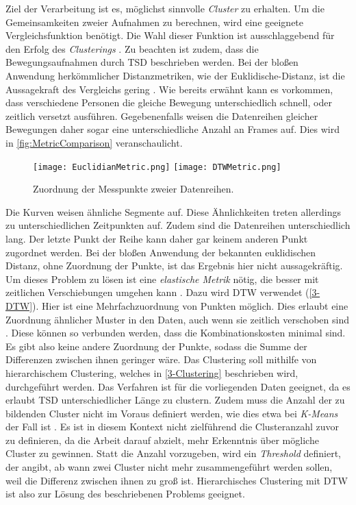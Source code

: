 Ziel der Verarbeitung ist es, möglichst sinnvolle \emph{Cluster} zu erhalten.
Um die Gemeinsamkeiten zweier Aufnahmen zu berechnen,
wird eine geeignete Vergleichsfunktion benötigt.
Die Wahl dieser Funktion ist ausschlaggebend für den Erfolg des \emph{Clusterings} \citep{warren_liao_clustering_2005}.
Zu beachten ist zudem, dass die Bewegungsaufnahmen durch \ac{TSD} beschrieben werden.
Bei der bloßen Anwendung herkömmlicher Distanzmetriken, wie der Euklidische-Distanz,
ist die Aussagekraft des Vergleichs gering \citep{warren_liao_clustering_2005}.
Wie bereits erwähnt kann es vorkommen, dass verschiedene Personen die gleiche Bewegung unterschiedlich schnell,
oder zeitlich versetzt ausführen.
Gegebenenfalls weisen die Datenreihen gleicher Bewegungen daher sogar eine unterschiedliche Anzahl an Frames auf.
Dies wird in \autoref{fig:MetricComparison} veranschaulicht.
\begin{figure}[ht]
    \begin{center}
    \texttt{[image: EuclidianMetric.png]}
    \texttt{[image: DTWMetric.png]}
    \end{center}
    \caption{Zuordnung der Messpunkte zweier Datenreihen.}
    \label{fig:MetricComparison}
\end{figure}
Die Kurven weisen ähnliche Segmente auf.
Diese Ähnlichkeiten treten allerdings zu unterschiedlichen Zeitpunkten auf.
Zudem sind die Datenreihen unterschiedlich lang.
Der letzte Punkt der Reihe kann daher gar keinem anderen Punkt zugordnet werden.
Bei der bloßen Anwendung der bekannten euklidischen Distanz,
ohne Zuordnung der Punkte, ist das Ergebnis hier nicht aussagekräftig.
Um dieses Problem zu lösen ist eine \emph{elastische Metrik} nötig,
die besser mit zeitlichen Verschiebungen umgehen kann \citep{aghabozorgi_time-series_2015}.
Dazu wird \ac{DTW} verwendet (\autoref{3-DTW}).
Hier ist eine Mehrfachzuordnung von Punkten möglich.
Dies erlaubt eine Zuordnung ähnlicher Muster in den Daten, auch wenn sie zeitlich verschoben sind \citep{mohammadzade_dynamic_2021}.
Diese können so verbunden werden, dass die Kombinationskosten minimal sind.
Es gibt also keine andere Zuordnung der Punkte,
sodass die Summe der Differenzen zwischen ihnen geringer wäre.
Das Clustering soll mithilfe von hierarchischem Clustering,
welches in \autoref{3-Clustering} beschrieben wird, durchgeführt werden.
Das Verfahren ist für die vorliegenden Daten geeignet,
da es erlaubt \ac{TSD} unterschiedlicher Länge zu clustern.
Zudem muss die Anzahl der zu bildenden Cluster nicht im Voraus definiert werden,
wie dies etwa bei \emph{K-Means} der Fall ist \citep{aghabozorgi_time-series_2015}.
Es ist in diesem Kontext nicht zielführend die Clusteranzahl zuvor zu definieren,
da die Arbeit darauf abzielt, mehr Erkenntnis über mögliche Cluster zu gewinnen.
Statt die Anzahl vorzugeben, wird ein \emph{Threshold} definiert, der angibt,
ab wann zwei Cluster nicht mehr zusammengeführt werden sollen,
weil die Differenz zwischen ihnen zu groß ist.
Hierarchisches Clustering mit \ac{DTW} ist also zur Lösung des beschriebenen Problems geeignet.